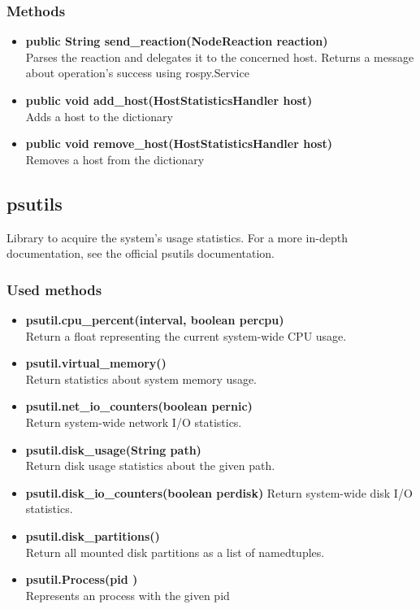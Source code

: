 \subsubsection{Methods}
\begin{itemize}
	\item \textbf{public String send\_reaction(NodeReaction reaction)}\\
	Parses the reaction and delegates it to the concerned host.
	Returns a message about operation's success using rospy.Service
	\item \textbf{public void add\_host(HostStatisticsHandler host)}\\
	Adds a host to the dictionary
	\item \textbf{public void remove\_host(HostStatisticsHandler host)}\\
	Removes a host from the dictionary
\end{itemize}

	
\subsection{psutils}
Library to acquire the system's usage statistics. For a more in-depth documentation, see the official psutils documentation.

\subsubsection{Used methods}
\begin{itemize}
	\item \textbf{psutil.cpu\_percent(interval, boolean percpu)}\\
	Return a float representing the current system-wide CPU usage.
	\item \textbf{psutil.virtual\_memory()}\\
	Return statistics about system memory usage.
	\item \textbf{psutil.net\_io\_counters(boolean pernic)}\\
	Return system-wide network I/O statistics.
	\item \textbf{psutil.disk\_usage(String path)}\\
	Return disk usage statistics about the given path.
	\item \textbf{psutil.disk\_io\_counters(boolean perdisk)}
	Return system-wide disk I/O statistics.
	\item \textbf{psutil.disk\_partitions()}\\
	Return all mounted disk partitions as a list of namedtuples.
	\item \textbf{psutil.Process(pid )}\\
	Represents an  process with the given pid
\end{itemize}


	